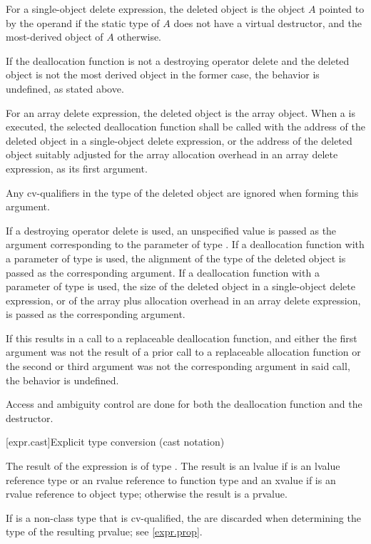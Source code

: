 \pnum
For a single-object delete expression,
the deleted object is
the object $A$ pointed to by the operand
if the static type of $A$ does not have a virtual destructor,
and the most-derived object of $A$ otherwise.
\begin{note}
If the deallocation function is not a destroying operator delete
and the deleted object is not the most derived object in the former case,
the behavior is undefined,
as stated above.
\end{note}
For an array delete expression,
the deleted object is
the array object.
When a 
is executed, the selected deallocation function shall be called with
the address of the deleted object
in a single-object delete expression, or
the address of the deleted object
suitably adjusted for the array allocation
overhead in an array delete expression,
as its first argument.
\begin{note}
Any cv-qualifiers in the type of the deleted object
are ignored when forming this argument.
\end{note}
If a destroying operator delete is used,
an unspecified value
is passed as the argument
corresponding to the parameter of type .
If a deallocation function
with a parameter of type 
is used,
the alignment of the type of the deleted object
is passed as the corresponding argument.
If a deallocation function
with a parameter of type  is used,
the size of the deleted object
in a single-object delete expression, or
of the array plus allocation overhead
in an array delete expression,
is passed as the corresponding argument.
\begin{note}
If this results in a call to a replaceable deallocation function,
and either
the first argument was not the result of
a prior call to a replaceable allocation function or
the second or third argument was not the corresponding argument in said call,
the behavior is undefined.
\end{note}

\pnum
Access and ambiguity control are done for both the deallocation function
and the destructor.

[expr.cast]{Explicit type conversion (cast notation)}%

\pnum
The result of the expression   is
of type . The result is an lvalue if  is an lvalue
reference type or an rvalue reference to function type and an xvalue if 
is an rvalue reference to object type; otherwise the result is a prvalue.
\begin{note}
If  is a non-class type that is cv-qualified, the
 are discarded when determining the type of the
resulting prvalue; see \ref{expr.prop}.
\end{note}

